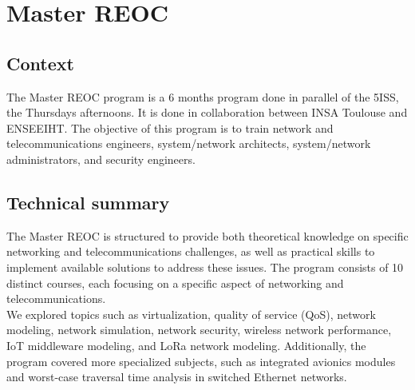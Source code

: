 \section{Master REOC}

\subsection{Context}
The Master REOC program is a 6 months program done in parallel of the 5ISS, the Thursdays afternoons. It is done in collaboration between INSA Toulouse and ENSEEIHT.
The objective of this program is to train network and telecommunications engineers, system/network architects, system/network administrators, and security engineers.

\subsection{Technical summary}

The Master REOC is structured to provide both theoretical knowledge on specific networking and telecommunications challenges, as well as practical skills to implement available solutions to address these issues.
The program consists of 10 distinct courses, each focusing on a specific aspect of networking and telecommunications.
\\
We explored topics such as virtualization, quality of service (QoS), network modeling, network simulation, network security, wireless network performance, IoT middleware modeling, and LoRa network modeling.
Additionally, the program covered more specialized subjects, such as integrated avionics modules and worst-case traversal time analysis in switched Ethernet networks.


